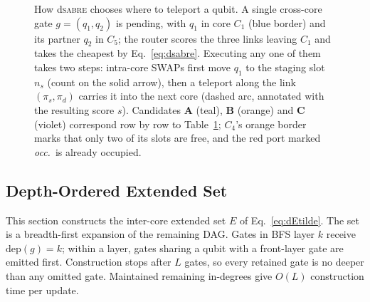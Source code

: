 \documentclass[journal]{IEEEtran}
\newcommand{\dSABRE}{d\textsc{sabre}}
\begin{document}
\begin{figure}[t]
\centering
\resizebox{\columnwidth}{!}{}
\caption{How \dSABRE{} chooses where to teleport a qubit. A single
  cross-core gate $g{=}(q_1,q_2)$ is pending, with $q_1$ in core $C_1$
  (blue border) and its partner $q_2$ in $C_5$; the router scores the three
  links leaving $C_1$ and takes the cheapest by Eq.~\eqref{eq:dsabre}.
  Executing any one of them takes two steps: intra-core SWAPs first move
  $q_1$ to the staging slot $n_s$ (count on the solid arrow), then a
  teleport along the link $(\pi_s,\pi_d)$ carries it into the next core
  (dashed arc, annotated with the resulting score $s$). Candidates
  \textbf{A} (teal), \textbf{B} (orange) and \textbf{C} (violet) correspond
  row by row to Table~\ref{tab:example}; $C_4$'s orange border marks that only
  two of its slots are free, and the red port marked \emph{occ.}\ is
  already occupied.}
\label{fig:tele-candidates}
\vspace{4pt}
\centering
{}
\label{tab:example}
\vspace{2pt}
\end{figure}

\subsection{Depth-Ordered Extended Set}
\label{sec:bfsext}

This section constructs the inter-core extended set $E$ of Eq.~\eqref{eq:dEtilde}. The set is a breadth-first expansion of the remaining DAG. Gates in BFS layer $k$ receive $\mathrm{dep}(g)=k$; within a layer, gates sharing a qubit with a front-layer gate are emitted first. Construction stops after $L$ gates, so every retained gate is no deeper than any omitted gate. Maintained remaining in-degrees give $O(L)$ construction time per update.
\end{document}
